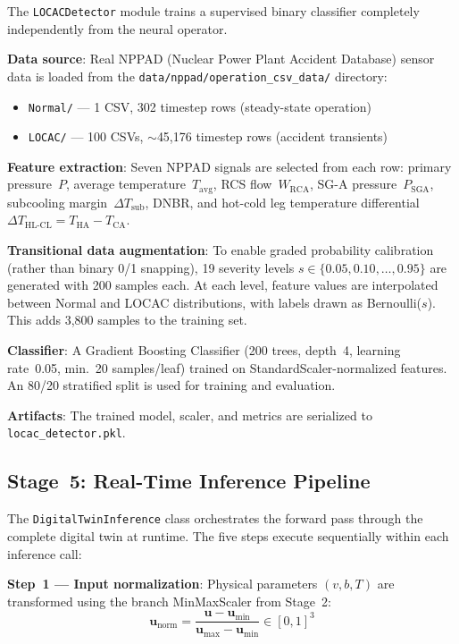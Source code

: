 \documentclass[conference]{IEEEtran}
\begin{document}
The \texttt{LOCACDetector} module trains a supervised binary classifier completely independently from the neural operator.

\textbf{Data source}: Real NPPAD (Nuclear Power Plant Accident Database) sensor data is loaded from the \texttt{data/nppad/operation\_csv\_data/} directory:
\begin{itemize}
    \item \texttt{Normal/} --- 1 CSV, 302 timestep rows (steady-state operation)
    \item \texttt{LOCAC/} --- 100 CSVs, $\sim$45,176 timestep rows (accident transients)
\end{itemize}

\textbf{Feature extraction}: Seven NPPAD signals are selected from each row: primary pressure~$P$, average temperature~$T_\text{avg}$, RCS flow~$W_\text{RCA}$, SG-A pressure~$P_\text{SGA}$, subcooling margin~$\Delta T_\text{sub}$, DNBR, and hot-cold leg temperature differential $\Delta T_\text{HL-CL} = T_\text{HA} - T_\text{CA}$.

\textbf{Transitional data augmentation}: To enable graded probability calibration (rather than binary 0/1 snapping), 19 severity levels $s \in \{0.05, 0.10, \ldots, 0.95\}$ are generated with 200 samples each. At each level, feature values are interpolated between Normal and LOCAC distributions, with labels drawn as Bernoulli($s$). This adds 3,800 samples to the training set.

\textbf{Classifier}: A Gradient Boosting Classifier (200 trees, depth~4, learning rate~0.05, min.\ 20 samples/leaf) trained on StandardScaler-normalized features. An 80/20 stratified split is used for training and evaluation.

\textbf{Artifacts}: The trained model, scaler, and metrics are serialized to \texttt{locac\_detector.pkl}.

\subsection{Stage~5: Real-Time Inference Pipeline}
\label{sec:inference_pipeline}

The \texttt{DigitalTwinInference} class orchestrates the forward pass through the complete digital twin at runtime. The five steps execute sequentially within each inference call:

\textbf{Step~1 --- Input normalization}: Physical parameters $(v, b, T)$ are transformed using the branch MinMaxScaler from Stage~2:
\begin{equation}
\bm{u}_\text{norm} = \frac{\bm{u} - \bm{u}_\text{min}}{\bm{u}_\text{max} - \bm{u}_\text{min}} \in [0,1]^3
\end{equation}
\end{document}

